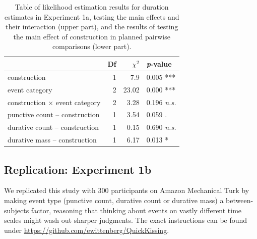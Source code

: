 \documentclass[preprint,12pt,authoryear]{elsarticle}
\begin{document}
\begin{table}[ht]
\centering
\begin{tabular}{lrrl}
  \hline
 & Df &  $\chi^2$ & \emph{p}-value \\ 
  \hline
construction          & 1 &  7.9 & 0.005 *** \\ 
  event category          & 2 &  23.02 & 0.000 ***\\ 
  construction $\times$ event category & 2 & 3.28 & 0.196 \emph{n.s.} \\    \hline
   punctive count -- construction    & 1 & 3.54 & 0.059 . \\    
   durative count -- construction    & 1  & 0.15 & 0.690 \emph{n.s.}\\ 
   durative mass -- construction   & 1 &  6.17 & 0.013 *\\ \hline
\end{tabular}
\caption{Table of likelihood estimation results for duration estimates in Experiment 1a, testing the main effects and their interaction (upper part), and the results of testing the main effect of construction in planned pairwise comparisons (lower part).}
\label{table_OEregr}
\end{table}




\subsection{Replication: Experiment 1b}\label{repl_OE}

We replicated this study with 300 participants on Amazon Mechanical Turk by making event type (punctive count, durative count or durative mass) a between-subjects factor, reasoning that thinking about events on vastly different time scales might wash out sharper judgments. \citep{grondin1999start,zakay1995attentional} The exact instructions can be found under \url{https://github.com/ewittenberg/QuickKissing}.
\end{document}

